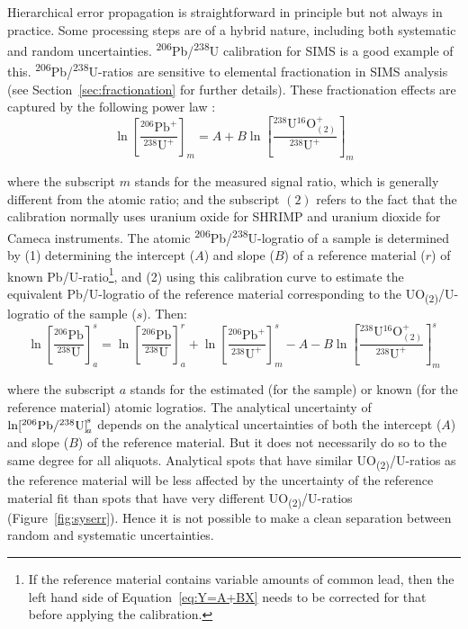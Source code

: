 \documentclass{article}
\begin{document}
Hierarchical error propagation is straightforward in principle but not
always in practice. Some processing steps are of a hybrid nature,
including both systematic and random uncertainties.
\textsuperscript{206}Pb/\textsuperscript{238}U calibration for SIMS is
a good example of
this. \textsuperscript{206}Pb/\textsuperscript{238}U-ratios are
sensitive to elemental fractionation in SIMS analysis (see
Section~\ref{sec:fractionation} for further details).  These
fractionation effects are captured by the following power law
\citep{williams1998,jeon2015}:
\begin{equation}
  \ln\!\left[\frac{{}^{206}\mbox{Pb}^+}{{}^{238}\mbox{U}^+}\right]_{\!m}
  = A + B
  \ln\!\left[\frac{{}^{238}\mbox{U}{}^{16}\mbox{O}^+_{(2)}}
                   {{}^{238}\mbox{U}^+}
        \right]_{\!m}
  \label{eq:Y=A+BX}
\end{equation}

\noindent where the subscript $m$ stands for the measured signal
ratio, which is generally different from the atomic ratio; and the
subscript $(2)$ refers to the fact that the calibration normally uses
uranium oxide for SHRIMP and uranium dioxide for Cameca
instruments. The atomic
\textsuperscript{206}Pb/\textsuperscript{238}U-logratio of a sample is
determined by (1) determining the intercept ($A$) and slope ($B$) of a
reference material ($r$) of known Pb/U-ratio\footnote{If the reference
material contains variable amounts of common lead, then the left hand
side of Equation~\ref{eq:Y=A+BX} needs to be corrected for that before
applying the calibration.}, and (2) using this calibration curve to
estimate the equivalent Pb/U-logratio of the reference material
corresponding to the UO\textsubscript{(2)}/U-logratio of the sample
($s$). Then:
\begin{equation}
  \ln\!\left[\frac{{}^{206}\mbox{Pb}}{{}^{238}\mbox{U}}\right]^{\!s}_{\!a} =
  \ln\!\left[\frac{{}^{206}\mbox{Pb}}{{}^{238}\mbox{U}}\right]^{\!r}_{\!a} +
  \ln\!\left[\frac{{}^{206}\mbox{Pb}^+}{{}^{238}\mbox{U}^+}\right]^{\!s}_{\!m} -
  A - B \ln\!\left[\frac{{}^{238}\mbox{U}{}^{16}\mbox{O}_{(2)}^+}
                   {{}^{238}\mbox{U}^+}
        \right]^{\!s}_{\!m}
\end{equation}

\noindent where the subscript $a$ stands for the estimated (for the
sample) or known (for the reference material) atomic logratios. The
analytical uncertainty of
$\ln\!\left[{\mbox{\textsuperscript{206}Pb}}/{\mbox{\textsuperscript{238}U}}\right]_{\!a}^{\!s}$
depends on the analytical uncertainties of both the intercept ($A$)
and slope ($B$) of the reference material. But it does not necessarily
do so to the same degree for all aliquots. Analytical spots that have
similar UO\textsubscript{(2)}/U-ratios as the reference material will
be less affected by the uncertainty of the reference material fit than
spots that have very different UO\textsubscript{(2)}/U-ratios
(Figure~\ref{fig:syserr}). Hence it is not possible to make a clean
separation between random and systematic uncertainties.
\end{document}

